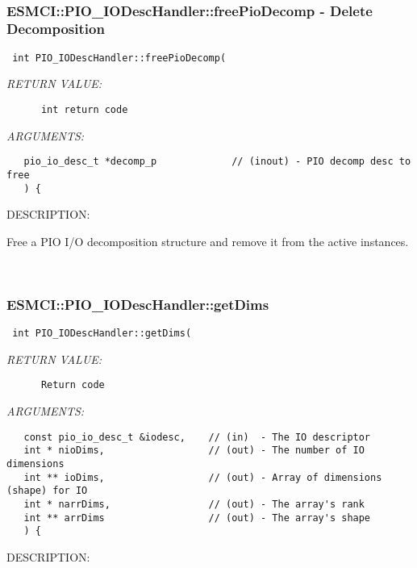  
\mbox{}\hrulefill\
 
\subsubsection [ESMCI::PIO\_IODescHandler::freePioDecomp] {ESMCI::PIO\_IODescHandler::freePioDecomp - Delete Decomposition}


  
\begin{verbatim} int PIO_IODescHandler::freePioDecomp(\end{verbatim}{\em RETURN VALUE:}
\begin{verbatim}      int return code\end{verbatim}{\em ARGUMENTS:}
\begin{verbatim}   pio_io_desc_t *decomp_p             // (inout) - PIO decomp desc to free
   ) {\end{verbatim}
{\sf DESCRIPTION:\\ }


      Free a PIO I/O decomposition structure and remove it from the
      active instances.
   
 
\mbox{}\hrulefill\
 
\subsubsection [ESMCI::PIO\_IODescHandler::getDims] {ESMCI::PIO\_IODescHandler::getDims}


  
\begin{verbatim} int PIO_IODescHandler::getDims(\end{verbatim}{\em RETURN VALUE:}
\begin{verbatim}      Return code\end{verbatim}{\em ARGUMENTS:}
\begin{verbatim}   const pio_io_desc_t &iodesc,    // (in)  - The IO descriptor
   int * nioDims,                  // (out) - The number of IO dimensions
   int ** ioDims,                  // (out) - Array of dimensions (shape) for IO
   int * narrDims,                 // (out) - The array's rank
   int ** arrDims                  // (out) - The array's shape
   ) {\end{verbatim}
{\sf DESCRIPTION:\\ }


